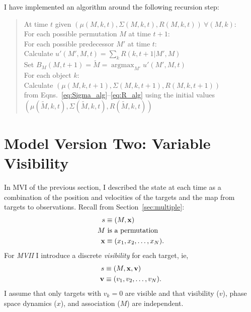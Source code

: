\documentclass[12pt]{article}
\newcommand{\argmax}{\operatorname*{argmax}}
\begin{document}
I have implemented an algorithm around the following recursion step:
\begin{verse}
  At time $t$ given $(\mu(M,k,t), \Sigma(M,k,t), R(M,k,t))~\forall
  (M,k)$:\\
  For each possible permutation $M$ at time $t+1$:\\
  \hspace{2em} For each possible predecessor $M'$ at time $t$:\\
  \hspace{4em}  Calculate $u'(M',M,t) = \sum_k R(k,t+1|M',M)$ \\
  \hspace{2em} Set $B_M(M,t+1) = \tilde M = \argmax_{M'}u'(M',M,t)$\\
  \hspace{2em} For each object $k$:\\
  \hspace{4em} Calculate $(\mu(M,k,t+1), \Sigma(M,k,t+1), R(M,k,t+1))$\\
  \hspace{4em} from Eqns.~\eqref{eq:Sigma_alg}--\eqref{eq:R_alg} using
  the initial values\\
  \hspace{4em} $(\mu(\tilde M,k,t), \Sigma(\tilde M,k,t),R(\tilde
  M,k,t))$
\end{verse}

\section{Model Version Two: Variable Visibility}
\label{sec:model2}

In MVI of the previous section, I described the state at each time as
a combination of the position and velocities of the targets and the
map from targets to observations.  Recall from
Section~\ref{sec:multiple}:
\begin{align*}
  s &\equiv (M,{\mathbf{x}}) \\
  M & \text{ is a permutation} \\
  {\mathbf{x}} &\equiv (x_1,x_2,\ldots,x_N).
\end{align*}
For \emph{MVII} I introduce a discrete \emph{visibility} for each
target, ie, \newcommand{\bv}{{\mathbf{v}}}
\begin{align*}
  s &\equiv (M,\bx,\bv) \\
  \bv &\equiv (v_1,v_2,\ldots,v_N).
\end{align*}
I assume that only targets with $v_k=0$ are visible and that
visibility ($v$), phase space dynamics ($x$), and association ($M$) are
independent.
\end{document}
